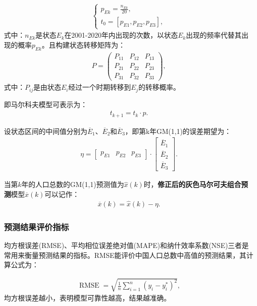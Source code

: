 \documentclass{whutmod}
\begin{document}
		\begin{gather}
		\left\{\begin{matrix}
		p_{Ek}=\frac{n_{Ek}}{20},\\
		t_{0}=[p_{E1},p_{E2},p_{E3}],
		\end{matrix}\right.
		\end{gather}
		式中：$n_{Ek}$是状态$E_{k}$在2001-2020年内出现的次数，以状态$E_{k}$出现的频率代替其出现的概率$p_{Ek}$。且构建状态转移矩阵为：
		\begin{gather*}
		P=\left(\begin{array}{lll}{P_{11}} & {P_{12}} & {P_{13}} \\ {P_{21}} & {P_{22}} & {P_{23}} \\ {P_{31}} & {P_{32}} & {P_{33}}\end{array}\right),
		\end{gather*}
		式中：$P_{ij}$是由状态$E_{i}$经过一个时期转移到$E_{j}$的转移概率。
		
		即马尔科夫模型可表示为：	  
		\begin{gather}
		t_{k+1}=t_{k} \cdot p.
		\end{gather}
		
		设状态区间的中间值分别为$\overline{E}_{1}$、$\overline{E}_{2}$和$\overline{E}_{3}$，即第k年GM(1,1)的误差期望为：
		\begin{gather}
		\eta =\begin{bmatrix}
		p_{E1} & p_{E2} & p_{E3}
		\end{bmatrix} \cdot\begin{bmatrix}
		\overline{E}_{1}\\ 
		\overline{E}_{2}\\ 
		\overline{E}_{3}
		\end{bmatrix}.
		\end{gather}
		
		当第$k$年的人口总数的GM(1,1)预测值为$\widehat{x}(k)$时，\textbf{修正后的灰色马尔可夫组合预测}模型$\overline{x}(k)$可以记作：
		\begin{gather}
		\overline{x}(k) =\widehat{x}(k)-\eta.
		\end{gather}
		\subsubsection{预测结果评价指标}
		均方根误差(RMSE)、平均相位误差绝对值(MAPE)和纳什效率系数(NSE)三者是常用来衡量预测结果的指标。RMSE能评价中国人口总数中高值的预测结果，其计算公式为：
		
		\begin{gather*}
		\operatorname{RMSE}=\sqrt{\frac{1}{n} \sum_{i=1}^{n}\left(y_{i}-y_{i}^{*}\right)^{2}},
		\end{gather*}
		均方根误差越小，表明模型可靠性越高，结果越准确。
		
\end{document}
